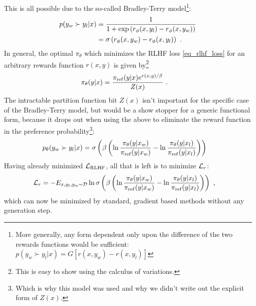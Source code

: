 This is all possible due to the so-called Bradley-Terry model\footnote{More generally, any form
dependent only upon the difference of the two rewards functions would be sufficient:  $p(y _{ w }
\succ y _{ l }| x) = G[r(x, y _{ w }) - r(x, y _{ l })]$}:
\begin{align}
    p(y _{ w } \succ y _{ l }| x )&= \frac{ 1 }{ 1 + \exp \left ( r _{\phi}(x, y _{ l }) -r _{ \phi
    }(x, y _{ w }) \right ) }   \nonumber\\
    &= \sigma \left (  r _{\phi}(x, y _{ w }) -r _{ \phi }(x, y _{ l })\right ) \ .
\end{align}
In general, the optimal $ \pi _{ \theta  } $ which minimizes the RLHF loss \eqref{eq_rlhf_loss} for
an arbitrary rewards function $ r(x, y) $ is given by\footnote{This is easy to show using the
calculus of variations.}
\begin{align}
\pi _{\theta}(y|x) &= \frac{ \pi _{ {\rm ref}} (y|x)e ^{ r(x, y)/ \beta  }  }{ Z(x) } \ .
\end{align}
The intractable partition function bit $ Z(x) $ isn't important for the specific case of the
Bradley-Terry model, but would be a show stopper for a generic functional form, because it drops out
when using the above to eliminate the reward function in the preference probability\footnote{Which
is why this model was used and why we didn't write out the explicit form of $ Z(x) $.}:
\begin{align}
p _{\theta} (y _{ w } \succ y _{ l }| x )&= \sigma \left (\beta \left (\ln \frac{ \pi _{
\theta }(y|x _{ w }) }{ \pi _{ {\rm ref} }(y|x _{ w }) }-\ln \frac{ \pi _{ \theta }(y|x _{ l }) }{ \pi
_{ {\rm ref} }(y|x _{  l}) }  \right )\right )
\end{align}
Having already minimized $ \mathcal{L} _{ {\rm RLHF} } $, all that is left is to minimize $ \mathcal{L} _{ r } $:
\begin{align}
    \mathcal{L} _{ r } &= -E _{ x, y _{ l }, y _{ w } \sim \mathcal{D} } \ln \sigma \left (\beta \left (\ln \frac{ \pi _{
\theta }(y|x _{ w }) }{ \pi _{ {\rm ref} }(y|x _{ w }) }-\ln \frac{ \pi _{ \theta }(y|x _{ l }) }{ \pi
_{ {\rm ref} }(y|x _{  l}) }  \right )\right ) \ , \label{eq_dpo_reward_loss}
\end{align}
which can now be minimized by standard, gradient based methods without any generation step.





